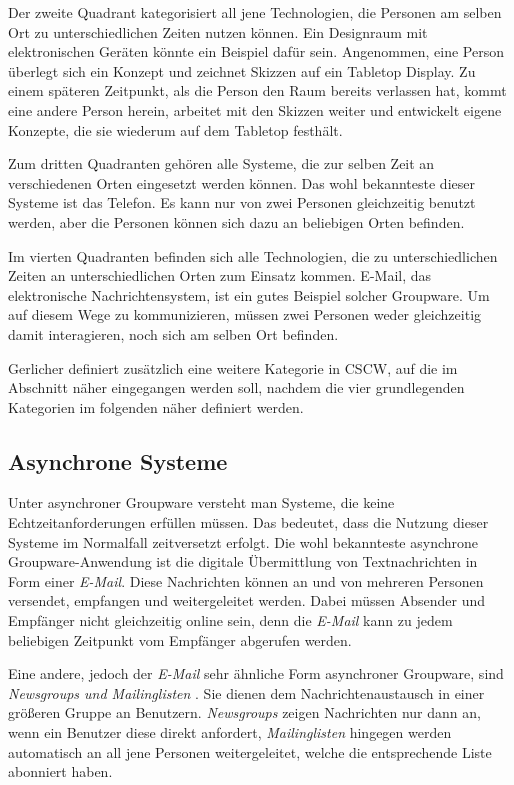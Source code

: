 Der zweite Quadrant kategorisiert all jene Technologien, die Personen am selben Ort zu unterschiedlichen Zeiten nutzen können. Ein Designraum mit elektronischen Geräten könnte ein Beispiel dafür sein. Angenommen, eine Person überlegt sich ein Konzept und zeichnet Skizzen auf ein Tabletop Display. Zu einem späteren Zeitpunkt, als die Person den Raum bereits verlassen hat, kommt eine andere Person herein, arbeitet mit den Skizzen weiter und entwickelt eigene Konzepte, die sie wiederum auf dem Tabletop festhält. 

Zum dritten Quadranten gehören alle Systeme, die zur selben Zeit an verschiedenen Orten eingesetzt werden können. Das wohl bekannteste dieser Systeme ist das Telefon. Es kann nur von zwei Personen gleichzeitig benutzt werden, aber die Personen können sich dazu an beliebigen Orten befinden.

Im vierten Quadranten befinden sich alle Technologien, die zu unterschiedlichen Zeiten an unterschiedlichen Orten zum Einsatz kommen. E-Mail, das elektronische Nachrichtensystem, ist ein gutes Beispiel solcher Groupware. Um auf diesem Wege zu kommunizieren, müssen zwei Personen weder gleichzeitig damit interagieren, noch sich am selben Ort befinden. 

\medskip Gerlicher definiert zusätzlich eine weitere Kategorie in \ac{CSCW}, auf die im Abschnitt  näher eingegangen werden soll, nachdem die vier grundlegenden Kategorien im folgenden näher definiert werden.

\subsection{Asynchrone Systeme} 

Unter asynchroner Groupware versteht man Systeme, die keine Echtzeitanforderungen erfüllen müssen. Das bedeutet, dass die Nutzung dieser Systeme im Normalfall zeitversetzt erfolgt. Die wohl bekannteste asynchrone Groupware-Anwendung ist die digitale Übermittlung von Textnachrichten in Form einer \emph{E-Mail}. Diese Nachrichten können an und von mehreren Personen versendet, empfangen und weitergeleitet werden. Dabei müssen Absender und Empfänger nicht gleichzeitig online sein, denn die \emph{E-Mail} kann zu jedem beliebigen Zeitpunkt vom Empfänger abgerufen werden.

Eine andere, jedoch der \emph{E-Mail} sehr ähnliche Form asynchroner Groupware, sind \emph{Newsgroups und Mailinglisten} \citep{Gerlicher:2007p241}. Sie dienen dem Nachrichtenaustausch in einer größeren Gruppe an Benutzern. \emph{Newsgroups} zeigen Nachrichten nur dann an, wenn ein Benutzer diese direkt anfordert, \emph{Mailinglisten} hingegen werden automatisch an all jene Personen weitergeleitet, welche die entsprechende Liste abonniert haben.

